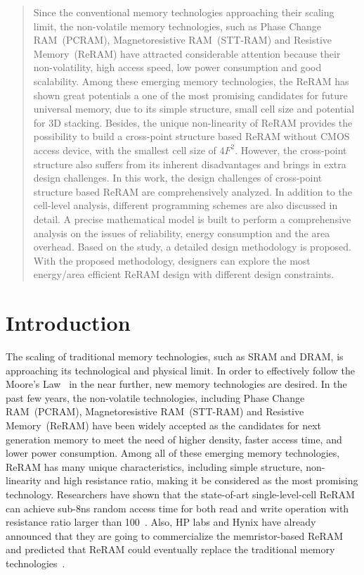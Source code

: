 \begin{abstract}
Since the conventional memory technologies approaching their scaling limit, the non-volatile memory technologies, such as Phase Change RAM~(PCRAM), Magnetoresistive RAM~(STT-RAM) and Resistive Memory~(ReRAM) have attracted considerable attention because their non-volatility, high access speed, low power consumption and good scalability. Among these emerging memory technologies, the ReRAM has shown great potentials a one of the most promising candidates for future universal memory, due to its simple structure, small cell size and potential for 3D stacking. Besides, the unique non-linearity of ReRAM provides the possibility to build a cross-point structure based ReRAM without CMOS access device, with the smallest cell size of $4F^2$. However, the cross-point structure also suffers from its inherent disadvantages and brings in extra design challenges. In this work, the design challenges of cross-point structure based ReRAM are comprehensively analyzed. In addition to the cell-level analysis, different programming schemes are also discussed in detail. A precise mathematical model is built to perform a comprehensive analysis on the issues of reliability, energy consumption and the area overhead. Based on the study, a detailed design methodology is proposed. With the proposed methodology, designers can explore the most energy/area efficient ReRAM design with different design constraints.
\end{abstract}

\vspace{10pt}
\section{Introduction}\label{sec:intro}
The scaling of traditional memory technologies, such as SRAM and DRAM, is approaching its technological and physical limit. In order to effectively follow the Moore's Law~\cite{moore} in the near further, new memory technologies are desired. In the past few years, the non-volatile technologies, including Phase Change RAM~(PCRAM), Magnetoresistive RAM~(STT-RAM) and Resistive Memory~(ReRAM) have been widely accepted as the candidates for next generation memory to meet the need of higher density, faster access time, and lower power consumption. Among all of these emerging memory technologies, ReRAM has many unique characteristics, including simple structure, non-linearity and high resistance ratio, making it be considered as the most promising technology. Researchers have shown that the state-of-art single-level-cell ReRAM can achieve sub-8ns random access time for both read and write operation with resistance ratio larger than 100~\cite{memristor:ISSCC2011_ITRI}. Also, HP labs and Hynix have already announced that they are going to commercialize the memristor-based ReRAM and predicted that ReRAM could eventually replace the traditional memory technologies~\cite{memristor:HpHynix}.

